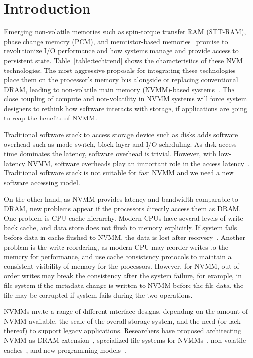 \section{Introduction}
\label{sec:introduction}

Emerging non-volatile memories such as spin-torque transfer RAM (STT-RAM),
phase change memory (PCM), and
memristor-based memories~\cite{moneta, monetad, quicksan,Onyx,
pollisbetterthaninterrupt}
promise to revolutionize I/O performance and how
systems manage and provide access to persistent state.
Table~\ref{table:techtrend}
shows the characteristics of these NVM technologies. The most aggressive
proposals for integrating these technologies place them on the processor's
memory bus alongside or replacing conventional DRAM, leading to non-volatile
main memory (NVMM)-based systems~\cite{PCM_EfficientMainMemory,
PCMHierarchy,eNVy,WSP}. The close coupling of compute and
non-volatility in NVMM systems will force system designers to rethink how
software interacts with storage, if applications are going to reap the benefits of NVMM.

Traditional software stack to access storage device such as disks
adds software overhead such as mode switch, block layer and I/O scheduling.
As disk access time dominates the latency, software overhead is trivial.
However, with low-latency NVMM, software overheads play an important role
in the access latency~\cite{monetad,BankShot}. Traditional software
stack is not suitable for fast NVMM and we need a new software accessing model.

On the other hand, as NVMM provides latency and bandwidth comparable to DRAM,
new problems
appear if the processors directly access them as DRAM. One problem is 
CPU cache hierarchy. Modern CPUs have several levels of write-back cache,
 and data store does not flush to memory explicitly. If system fails before
data in cache flushed to NVMM, the data is lost after
recovery~\cite{CPUcaching}. Another
problem is the write reordering, as modern CPU may reorder writes to the
memory for performance, and use cache consistency protocols to maintain
a consistent visibility of memory for the processors. However, for NVMM,
out-of-order writes may break the consistency after the system failure,
for example, in file system if the metadata change is written to NVMM before
the file data, the file may be corrupted if system fails during the two 
operations. 

NVMMs invite a range of different interface designs, depending on the amount of
NVMM available, the scale of the overall storage system, and the need (or lack
thereof) to support legacy applications.  Researchers have proposed architecting
NVMM as DRAM extension~\cite{pdram, memorage, duet}, specialized
file systems for NVMMs~\cite{PMFS,BPFS}, non-volatile
caches~\cite{RVM,riofilecache,riovista}, and new programming
models~\cite{nvheaps,mnemosyne}.

